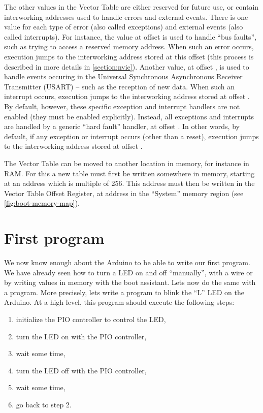 The other values in the Vector Table are either reserved for future use, or
contain interworking addresses used to handle errors and external events. There
is one value for each type of error (also called exceptions) and external
events (also called interrupts). For instance, the value at offset  is
used to handle ``bus faults'', such as trying to access a reserved memory
address. When such an error occurs, execution jumps to the interworking address
stored at this offset (this process is described in more details in
\cref{section:nvic}). Another value, at offset , is used to handle
events occuring in the Universal Synchronous Asynchronous Receiver Transmitter
(USART) -- such as the reception of new data. When such an interrupt occurs,
execution jumps to the interworking address stored at offset . By
default, however, these specific exception and interrupt handlers are not
enabled (they must be enabled explicitly). Instead, all exceptions and
interrupts are handled by a generic ``hard fault'' handler, at offset .
In other words, by default, if any exception or interrupt occurs (other than a
reset), execution jumps to the interworking address stored at offset .

The Vector Table can be moved to another location in memory, for instance in
RAM. For this a new table must first be written somewhere in memory, starting
at an address which is multiple of 256. This address must then be written in
the Vector Table Offset Register, at address  in the ``System''
memory region (see \cref{fig:boot-memory-map}).

\section{First program}\label{section:blink-led}

We now know enough about the Arduino to be able to write our first program. We
have already seen how to turn a LED on and off ``manually'', with a wire or by
writing values in memory with the boot assistant. Lets now do the same with a
program. More precisely, lets write a program to blink the ``L'' LED on the
Arduino. At a high level, this program should execute the following steps:
\begin{enumerate}
  \item initialize the PIO controller to control the LED,
  \item turn the LED on with the PIO controller,
  \item wait some time,
  \item turn the LED off with the PIO controller,
  \item wait some time,
  \item go back to step 2.
\end{enumerate}

